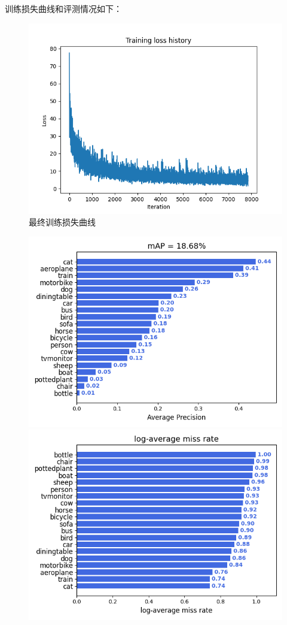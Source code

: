 \documentclass{article}%
\begin{document}
训练损失曲线和评测情况如下：
\begin{figure}[H]
	\centering
    \includegraphics[width=0.7\linewidth]{fast_rcnn/training_loss.png}
    \caption{最终训练损失曲线}
\end{figure}
\begin{figure}[H]
    \centering
	\begin{minipage}{0.49\linewidth}
		\centering
		\includegraphics[width=0.9\linewidth]{fast_rcnn/mAP_output/mAP.png}
	\end{minipage}
	\begin{minipage}{0.49\linewidth}
		\centering
		\includegraphics[width=0.9\linewidth]{fast_rcnn/mAP_output/lamr.png}
	\end{minipage}
\end{figure}
\end{document}
